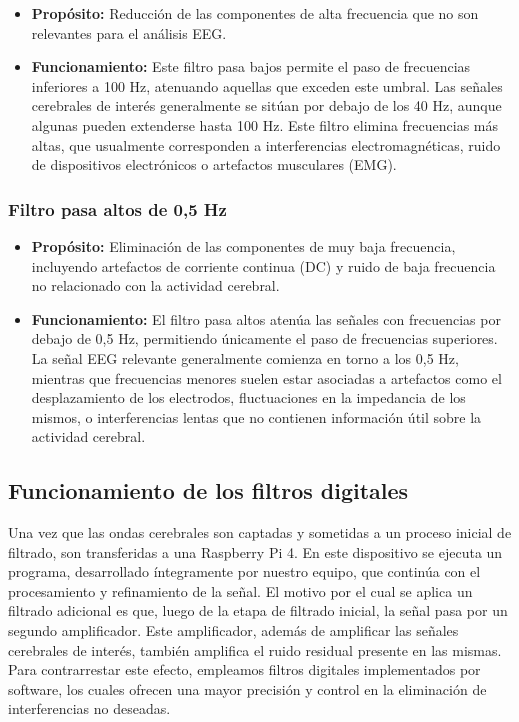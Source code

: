 \documentclass{article}
\begin{document}
\begin{itemize}

    \item \textbf{Propósito:} Reducción de las componentes de alta frecuencia que no son relevantes para el análisis EEG.
    
    \item \textbf{Funcionamiento:} Este filtro pasa bajos permite el paso de frecuencias inferiores a 100 Hz, atenuando aquellas que exceden este umbral. Las señales cerebrales de interés generalmente se sitúan por debajo de los 40 Hz, aunque algunas pueden extenderse hasta 100 Hz. Este filtro elimina frecuencias más altas, que usualmente corresponden a interferencias electromagnéticas, ruido de dispositivos electrónicos o artefactos musculares (EMG).
    
\end{itemize}

\subsubsection{Filtro pasa altos de 0,5 Hz}

\begin{itemize}

    \item \textbf{Propósito:} Eliminación de las componentes de muy baja frecuencia, incluyendo artefactos de corriente continua (DC) y ruido de baja frecuencia no relacionado con la actividad cerebral.
    
    \item \textbf{Funcionamiento:} El filtro pasa altos atenúa las señales con frecuencias por debajo de 0,5 Hz, permitiendo únicamente el paso de frecuencias superiores. La señal EEG relevante generalmente comienza en torno a los 0,5 Hz, mientras que frecuencias menores suelen estar asociadas a artefactos como el desplazamiento de los electrodos, fluctuaciones en la impedancia de los mismos, o interferencias lentas que no contienen información útil sobre la actividad cerebral.
    
\end{itemize}

\subsection{Funcionamiento de los filtros digitales}

Una vez que las ondas cerebrales son captadas y sometidas a un proceso inicial de filtrado, son transferidas a una Raspberry Pi 4. En este dispositivo se ejecuta un programa, desarrollado íntegramente por nuestro equipo, que continúa con el procesamiento y refinamiento de la señal. El motivo por el cual se aplica un filtrado adicional es que, luego de la etapa de filtrado inicial, la señal pasa por un segundo amplificador. Este amplificador, además de amplificar las señales cerebrales de interés, también amplifica el ruido residual presente en las mismas. Para contrarrestar este efecto, empleamos filtros digitales implementados por software, los cuales ofrecen una mayor precisión y control en la eliminación de interferencias no deseadas.
\end{document}
